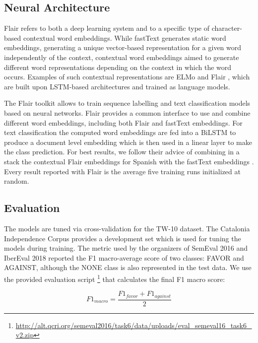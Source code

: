 \documentclass[10pt, a4paper]{article}
\begin{document}
\subsection{Neural Architecture}\label{sec:neural-architecture}

Flair refers to both a deep learning system and to a specific type of character-based contextual word embeddings. While fastText generates static word embeddings, generating a unique vector-based representation for a given word independently of the context, contextual word embeddings aimed to generate different word representations depending on the context in which the word occurs. Examples of such contextual representations are ELMo \cite{Peters:2018} and Flair \cite{akbik-etal-2018-contextual}, which are built upon LSTM-based architectures and trained as language models.

The Flair toolkit \cite{akbik-etal-2019-flair} allows to train sequence labelling and text classification models based on neural networks. Flair provides a common interface to use and combine different word embeddings, including both Flair and fastText embeddings. For text classification the computed word embeddings are fed into a BiLSTM to produce a document level embedding which is then used in a linear layer to make the class prediction. For best results, we follow their advice of combining in a stack the contextual Flair embeddings for Spanish with the fastText embeddings \cite{akbik-etal-2018-contextual}. Every result reported with Flair is the average five training runs initialized at random.

\subsection{Evaluation}\label{sec:evaluation}

The models are tuned via cross-validation for the TW-10 dataset. The Catalonia Independence Corpus provides a development set which is used for tuning the models during training. The metric used by the organizers of SemEval 2016 \cite{mohammad-etal-2016-semeval} and IberEval 2018 \cite{taule18} reported the F1 macro-average score of two classes: FAVOR and AGAINST, although the NONE class is also represented in the test data. We use the provided evaluation script \footnote{\url{http://alt.qcri.org/semeval2016/task6/data/uploads/eval_semeval16_task6_v2.zip}} that calculates the final F1 macro score:

\[F1_{macro} = \frac{F1_{favor} + F1_{against}}{2}\]
\end{document}
